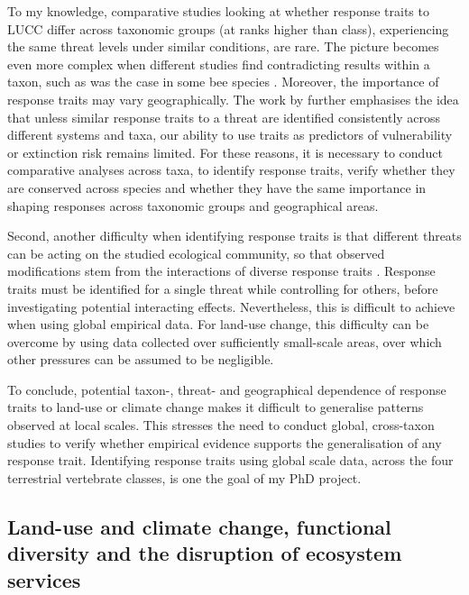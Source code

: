 To my knowledge, comparative studies looking at whether response traits to LUCC differ across taxonomic groups (at ranks higher than class), experiencing the same threat levels under similar conditions, are rare. The picture becomes even more complex when different studies find contradicting results within a taxon, such as was the case in some bee species \citep{Bartomeus2018}. Moreover, the importance of response traits may vary geographically. The work by \citet{Bartomeus2018} further emphasises the idea that unless similar response traits to a threat are identified consistently across different systems and taxa, our ability to use traits as predictors of vulnerability or extinction risk remains limited. For these reasons, it is necessary to conduct comparative analyses across taxa, to identify response traits, verify whether they are conserved across species and whether they have the same importance in shaping responses across taxonomic groups and geographical areas. 

Second, another difficulty when identifying response traits is that different threats can be acting on the studied ecological community, so that observed modifications stem from the interactions of diverse response traits \citep{Gonzalez-Suarez2013}. Response traits must be identified for a single threat while controlling for others, before investigating potential interacting effects. Nevertheless, this is difficult to achieve when using global empirical data.  For land-use change, this difficulty can be overcome by using data collected over sufficiently small-scale areas, over which other pressures can be assumed to be negligible. 

To conclude, potential taxon-, threat- and geographical dependence of response traits to land-use or climate change makes it difficult to generalise patterns observed at local scales. This stresses the need to conduct global, cross-taxon studies to verify whether empirical evidence supports the generalisation of any response trait. Identifying response traits using global scale data, across the four terrestrial vertebrate classes, is one the goal of my PhD project.

\subsection{Land-use and climate change, functional diversity and the disruption of ecosystem services}

